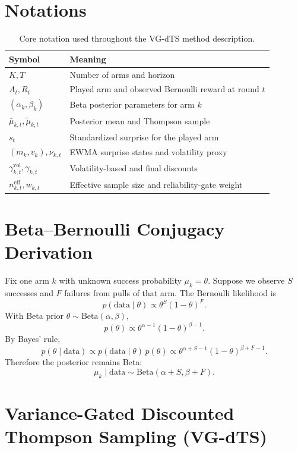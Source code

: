 \section{Notations}
\begin{table}[!htbp]
\centering
\normalsize
\setlength{\tabcolsep}{5pt}
\begin{tabular}{ll}
\toprule
Symbol & Meaning \\
\midrule
$K,T$ & Number of arms and horizon \\
$A_t,R_t$ & Played arm and observed Bernoulli reward at round $t$ \\
$(\alpha_k,\beta_k)$ & Beta posterior parameters for arm $k$ \\
$\bar{\mu}_{k,t},\widetilde{\mu}_{k,t}$ & Posterior mean and Thompson sample \\
$s_t$ & Standardized surprise for the played arm \\
$(m_k,v_k),\nu_{k,t}$ & EWMA surprise states and volatility proxy \\
$\gamma^{\mathrm{vol}}_{k,t},\gamma_{k,t}$ & Volatility-based and final discounts \\
$n^{\mathrm{eff}}_{k,t},w_{k,t}$ & Effective sample size and reliability-gate weight \\
\bottomrule
\end{tabular}
\caption{Core notation used throughout the VG-dTS method description.}
\label{tab:notation_summary}
\end{table}

\section{Beta--Bernoulli Conjugacy Derivation}
\label{app:beta_conjugacy}
Fix one arm $k$ with unknown success probability $\mu_k=\theta$. Suppose we observe $S$ successes and $F$ failures from pulls of that arm. The Bernoulli likelihood is
\[
p(\text{data}\mid \theta)\propto \theta^{S}(1-\theta)^{F}.
\]
With Beta prior $\theta\sim\mathrm{Beta}(\alpha,\beta)$,
\[
p(\theta)\propto \theta^{\alpha-1}(1-\theta)^{\beta-1}.
\]
By Bayes' rule,
\[
p(\theta\mid \text{data})\propto p(\text{data}\mid \theta)\,p(\theta)
\propto \theta^{\alpha+S-1}(1-\theta)^{\beta+F-1}.
\]
Therefore the posterior remains Beta:
\begin{equation}
\mu_k \mid \text{data} \sim \mathrm{Beta}(\alpha+S,\beta+F).
\end{equation}

\section{Variance-Gated Discounted Thompson Sampling (VG-dTS)}
\label{app:vgdts}

